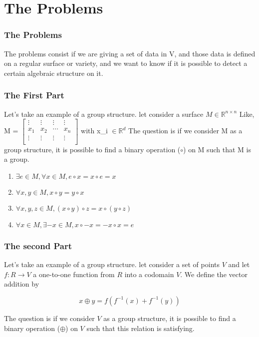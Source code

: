 \documentclass[11pt]{beamer}
\begin{document}


\section{The Problems}
\begin{frame}
    \frametitle{The Problems}
    The problems consist if we are giving a set of data in V, and those data is defined on a regular surface or variety, and we want to know if it is possible to detect a certain algebraic structure on it.
\end{frame}
\begin{frame}
		\frametitle{The First Part}
	Let's take an example of a group structure.
	let consider a surface $M \in \mathbb{R}^{n \times n}$
	Like, 
	M = 
	$\begin{bmatrix}
		\vdots & \vdots & \vdots &\vdots \\
		x_{1} & x_{2} & \cdots & x_{n} \\
		\vdots & \vdots & \vdots &\vdots \\
	\end{bmatrix}$
	with x_{i} $\in \mathbb{R}^{d}$
	The question is if we consider M as a group structure, it is possible to find a binary operation ($\circ$) on M such that M is a group.
	\begin{enumerate}
		\item $\exists e \in M, \forall x \in M, e \circ x = x \circ e = x$
		\item $\forall{} x,y \in{} M, x \circ y = y \circ x$
		\item $\forall x,y,z \in M, (x \circ y) \circ z = x \circ (y \circ z)$
		\item $\forall x \in M, \exists -x \in M, x \circ -x = -x \circ x = e$
	\end{enumerate}
\end{frame}







\begin{frame}
    \frametitle{The second Part}
	Let's take an example of a group structure.
	let consider a set of points  $ V $ and let  $ f: R \rightarrow V $ a one-to-one
	function from $R$ into a codomain $V$. We define the vector addition by
	
     $$ x \oplus y = f(f^{-1}(x) + f^{-1}(y)) $$
		


	The question is if we consider $V$ as a group structure, it is possible to find a binary operation ($\oplus$) on $V$ such that this relation is satisfying.
	
\end{frame}
\end{document}
